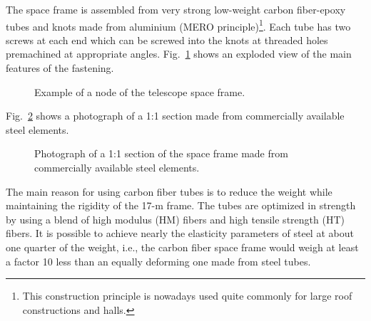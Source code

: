 
The space frame is assembled from very strong low-weight carbon fiber-epoxy
tubes and knots made from aluminium (MERO principle)\footnote{%
This construction principle is nowadays used quite commonly for large roof
constructions and halls.}. Each tube has two screws at each end which can be
screwed into the knots at threaded holes premachined
at appropriate angles. Fig.~\ref{fig-node}
shows an exploded view of the main features of the fastening.

\begin{figure}[htb]
\leavevmode
\centering
\epsfxsize=11cm
\caption{Example of a node of the telescope space frame.}
\label{fig-node}
\end{figure}



Fig.~\ref{fig-sawallisch} shows a photograph of a 1:1 section made from commercially available
steel elements.
\begin{figure}[htb]
\leavevmode
\centering
\epsfxsize=12cm
\caption{Photograph of a 1:1 section of the space
frame made from commercially available steel elements.}
\label{fig-sawallisch}
\end{figure}

The main reason for using carbon fiber tubes is to reduce the weight while
maintaining the rigidity of the 17-m frame. The tubes are optimized in
strength by using a blend of high modulus (HM) fibers and high tensile
strength (HT) fibers. It is possible to achieve nearly the elasticity
parameters of steel at about one quarter of the weight, i.e., the carbon
fiber space frame would weigh at least a factor 10 less than an equally
deforming one made from steel tubes.

